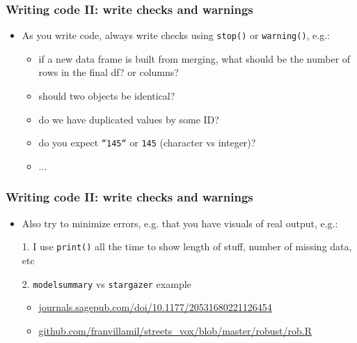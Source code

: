 \documentclass[aspectratio=43]{beamer}
\begin{document}
\begin{frame}
\frametitle{Writing code II: write checks and warnings}
\centering

\begin{itemize}
  \item As you write code, always write checks using \texttt{stop()} or \texttt{warning()}, e.g.:
  \begin{itemize}
    \item if a new data frame is built from merging, what should be the number of rows in the final df? or columns?
    \item should two objects be identical?
    \item do we have duplicated values by some ID?
    \item do you expect \texttt{``145``} or \texttt{145} (character vs integer)?
    \item ...
    \item[]
  \end{itemize}
\end{itemize}

\end{frame}



\begin{frame}
\frametitle{Writing code II: write checks and warnings}
\centering

\begin{itemize}
\item Also try to minimize errors, e.g. that you have visuals of real output, e.g.:
\item[1.] I use \texttt{print()} all the time to show length of stuff, number of missing data, etc
\item[2.] \texttt{modelsummary} vs \texttt{stargazer} example
  \begin{itemize}
    \item \href{https://journals.sagepub.com/doi/10.1177/20531680221126454}{journals.sagepub.com/doi/10.1177/20531680221126454}
    \item \href{https://github.com/franvillamil/streets_vox/blob/master/robust/rob.R}{github.com/franvillamil/streets\_vox/blob/master/robust/rob.R}
  \end{itemize}
\end{itemize}

\end{frame}
\end{document}
